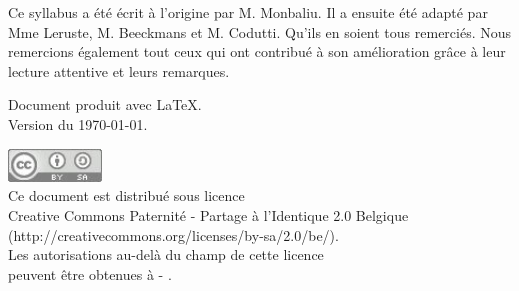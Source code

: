 \clearpage
\thispagestyle{empty}

\vfill

Ce syllabus a été écrit à l'origine par M. Monbaliu.
Il a ensuite été adapté par Mme Leruste, M. Beeckmans et M. Codutti.
Qu'ils en soient tous remerciés.
Nous remercions également tout ceux qui ont contribué à son amélioration
grâce à leur lecture attentive et leurs remarques. 

\bigskip
Document produit avec \LaTeX.
\\Version du \today.

\vfill

{
\color{MidnightBlue}
}

\vfill

\includegraphics[width=25mm]{image/cc-gris}
\\
Ce document est distribué sous licence 
\\Creative Commons Paternité - Partage à l'Identique 2.0 Belgique 
\\(http://creativecommons.org/licenses/by-sa/2.0/be/).
\\Les autorisations au-delà du champ de cette licence
\\peuvent être obtenues à \entitesite{} - \texttt{\contact}.
\pagestyle{fancy}

\setcounter{tocdepth}{1}
\tableofcontents{}


